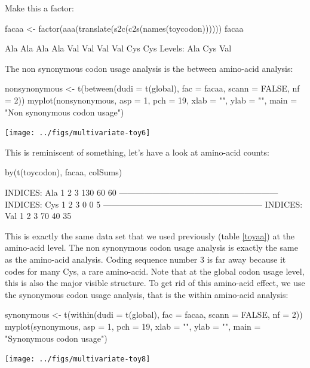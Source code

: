 \documentclass{article}
\begin{document}
Make this a factor:

\begin{Schunk}
\begin{Sinput}
 facaa <- factor(aaa(translate(s2c(c2s(names(toycodon))))))
 facaa
\end{Sinput}
\begin{Soutput}
 [1] Ala Ala Ala Ala Val Val Val Val Cys Cys
Levels: Ala Cys Val
\end{Soutput}
\end{Schunk}

The non synonymous codon usage analysis is the between amino-acid analysis:

\begin{Schunk}
\begin{Sinput}
 nonsynonymous <- t(between(dudi = t(global), fac = facaa, 
     scann = FALSE, nf = 2))
 myplot(nonsynonymous, asp = 1, pch = 19, xlab = "", ylab = "", 
     main = "Non synonymous codon usage")
\end{Sinput}
\end{Schunk}
\texttt{[image: ../figs/multivariate-toy6]}

This is reminiscent of something, let's have a look at amino-acid counts:

\begin{Schunk}
\begin{Sinput}
 by(t(toycodon), facaa, colSums)
\end{Sinput}
\begin{Soutput}
INDICES: Ala
  1   2   3 
130  60  60 
--------------------------------------------------------- 
INDICES: Cys
1 2 3 
0 0 5 
--------------------------------------------------------- 
INDICES: Val
 1  2  3 
70 40 35 
\end{Soutput}
\end{Schunk}

This is exactly the same data set that we used previously (table \ref{toyaa}) at the amino-acid
level. The non synonymous codon usage analysis is exactly the same as the amino-acid analysis.
Coding sequence number 3 is far away because it codes for many Cys, a rare amino-acid. Note
that at the global codon usage level, this is also the major visible structure. To get rid of this
amino-acid effect, we use the synonymous codon usage analysis, that is the within amino-acid
analysis:

\begin{Schunk}
\begin{Sinput}
 synonymous <- t(within(dudi = t(global), fac = facaa, scann = FALSE, 
     nf = 2))
 myplot(synonymous, asp = 1, pch = 19, xlab = "", ylab = "", 
     main = "Synonymous codon usage")
\end{Sinput}
\end{Schunk}
\texttt{[image: ../figs/multivariate-toy8]}
\end{document}
